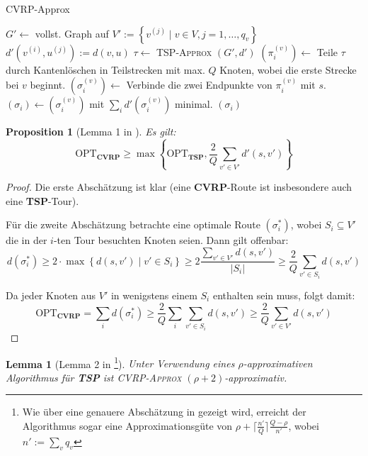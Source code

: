 \documentclass[a4paper,ngerman,12pt,bibtotoc]{scrartcl}
\theoremstyle{definition}
\theoremstyle{plain}
\newtheorem{prop}[defn]{Proposition}
\newtheorem{lemma}[defn]{Lemma}
\theoremstyle{remark}
\newcommand{\RR}{\mathbb{R}}
\newcommand{\OPT}{\mathrm{OPT}}
\newcommand{\TSP}{\textbf{TSP}}
\newcommand{\CVRP}{\textbf{CVRP}}
\begin{document}
	\begin{algorithm}[H]
		\caption{CVRP-Approx}\label{AlgCVRP}
		\begin{algorithmic}[1]
			\Procedure{CVRP}{$G=(V,E)$, $d:E\to \RR_{\geq 0}, Q, (q_v)_{v\in V}$}
			\State $G' \gets$ vollst. Graph auf $V' := \left\lbrace v^{(j)} \mid v \in V, j=1,\dots,q_v\right\rbrace$
			\State $d'(v^{(i)}, u^{(j)}) := d(v,u)$
			\State $\tau \gets$ \textsc{TSP-Approx} $\left(G', d'\right)$
				\State $\left(\pi_i^{(v)}\right) \gets$ Teile $\tau$ durch Kantenlöschen in Teilstrecken mit max. $Q$ Knoten,
				\Statex \hspace{8em} wobei die erste Strecke bei $v$ beginnt.
				\State $\left(\sigma_i^{(v)}\right) \gets$ Verbinde die zwei Endpunkte von $\pi^{(v)}_i$ mit $s$.
			\EndFor
			\State $\left(\sigma_i\right) \gets \left(\sigma_i^{(v)}\right)$ mit $\sum_i d'(\sigma_i^{(v)})$ minimal.
			\State \Return $\left(\sigma_i\right)$
			\EndProcedure
		\end{algorithmic}
	\end{algorithm}	
	
	\begin{prop}[Lemma 1 in \cite{CVRPApprox}]\label{CVRPLowerBound}
		Es gilt: 
			\[\OPT_\CVRP \geq \max\left\lbrace\OPT_\TSP, \frac{2}{Q}\sum_{v'\in V'}d'(s,v')\right\rbrace\]
	\end{prop}
	
	\begin{proof}
		Die erste Abschätzung ist klar (eine \CVRP-Route ist insbesondere auch eine \TSP-Tour).
		
		Für die zweite Abschätzung betrachte eine optimale Route $\left(\sigma_i^\ast\right)$, wobei $S_i \subseteq V'$ die in der $i$-ten Tour besuchten Knoten seien. Dann gilt offenbar:
			\[d\left(\sigma_i^\ast\right) \geq 2\cdot \max\left\lbrace d(s,v') \mid v'\in S_i\right\rbrace \geq 2\frac{\sum_{v'\in V'}d(s,v')}{\left|S_i\right|} \geq \frac{2}{Q}\sum_{v'\in S_i}d(s,v')\]
		
		Da jeder Knoten aus $V'$ in wenigstens einem $S_i$ enthalten sein muss, folgt damit:
			\[\OPT_\CVRP = \sum_i d\left(\sigma_i^\ast\right) \geq \frac{2}{Q}\sum_i\sum_{v'\in S_i}d(s,v') \geq \frac{2}{Q}\sum_{v'\in V'}d(s,v')\]
	\end{proof}
	
	\begin{lemma}[Lemma 2 in \cite{CVRPApprox}\footnote{Wie über eine genauere Abschätzung in \cite{TourSpliting} gezeigt wird, erreicht der Algorithmus sogar eine Approximationsgüte von $\rho + \lceil\frac{n'}{Q}\rceil \frac{Q-\rho}{n'}$, wobei $n' := \sum_v q_v$}]\label{AlgCVRPProof}
		Unter Verwendung eines $\rho$-approximativen Algorithmus für \TSP{} ist \textsc{CVRP-Approx} $(\rho+2)$-approximativ.
	\end{lemma}	
	
\end{document}
